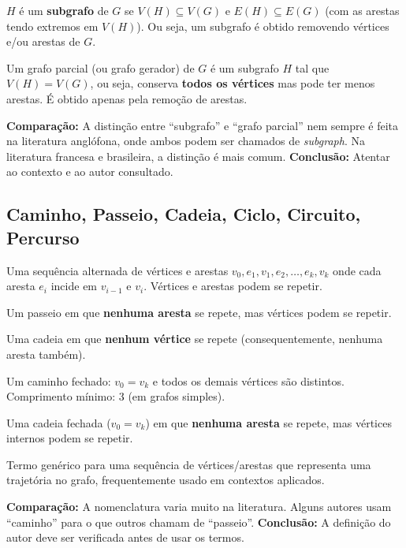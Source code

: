 \documentclass[12pt,a4paper]{article}
\begin{document}
\begin{description}[leftmargin=0pt]
  \item[Subgrafo] $H$ é um \textbf{subgrafo} de $G$ se $V(H) \subseteq V(G)$ e $E(H) \subseteq E(G)$ (com as arestas tendo extremos em $V(H)$). Ou seja, um subgrafo é obtido removendo vértices e/ou arestas de $G$.

  \item[Grafo Parcial] Um grafo parcial (ou grafo gerador) de $G$ é um subgrafo $H$ tal que $V(H) = V(G)$, ou seja, conserva \textbf{todos os vértices} mas pode ter menos arestas. É obtido apenas pela remoção de arestas.

  \textbf{Comparação:} A distinção entre ``subgrafo'' e ``grafo parcial'' nem sempre é feita na literatura anglófona, onde ambos podem ser chamados de \textit{subgraph}. Na literatura francesa e brasileira, a distinção é mais comum. \textbf{Conclusão:} Atentar ao contexto e ao autor consultado.
\end{description}

\subsection{Caminho, Passeio, Cadeia, Ciclo, Circuito, Percurso}

\begin{description}[leftmargin=0pt]
  \item[Passeio (Caminhada)] Uma sequência alternada de vértices e arestas $v_0, e_1, v_1, e_2, \ldots, e_k, v_k$ onde cada aresta $e_i$ incide em $v_{i-1}$ e $v_i$. Vértices e arestas podem se repetir.

  \item[Cadeia (Trilha)] Um passeio em que \textbf{nenhuma aresta} se repete, mas vértices podem se repetir.

  \item[Caminho] Uma cadeia em que \textbf{nenhum vértice} se repete (consequentemente, nenhuma aresta também).

  \item[Ciclo] Um caminho fechado: $v_0 = v_k$ e todos os demais vértices são distintos. Comprimento mínimo: 3 (em grafos simples).

  \item[Circuito] Uma cadeia fechada ($v_0 = v_k$) em que \textbf{nenhuma aresta} se repete, mas vértices internos podem se repetir.

  \item[Percurso (Rota)] Termo genérico para uma sequência de vértices/arestas que representa uma trajetória no grafo, frequentemente usado em contextos aplicados.

  \textbf{Comparação:} A nomenclatura varia muito na literatura. Alguns autores usam ``caminho'' para o que outros chamam de ``passeio''. \textbf{Conclusão:} A definição do autor deve ser verificada antes de usar os termos.
\end{description}
\end{document}
